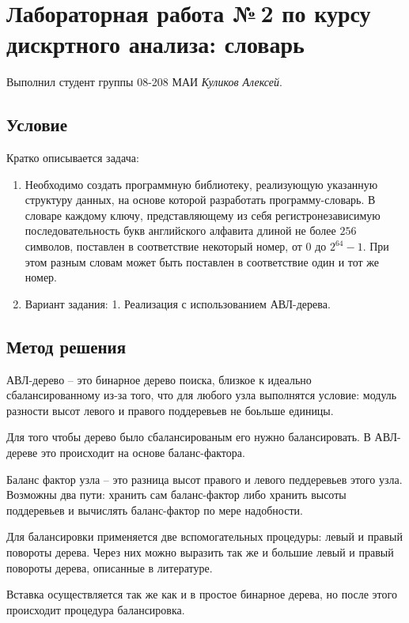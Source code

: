 \documentclass[12pt]{article}
\begin{document}
\section*{Лабораторная работа №\,2 по курсу дискртного анализа: словарь}

Выполнил студент группы 08-208 МАИ \textit{Куликов Алексей}.

\subsection*{Условие}

Кратко описывается задача: 
\begin{enumerate}
\item Необходимо создать программную библиотеку, реализующую указанную структуру данных, на основе которой разработать программу-словарь. В словаре каждому ключу, представляющему из себя регистронезависимую последовательность букв английского алфавита длиной не более $256$ символов, поставлен в соответствие некоторый номер, от $0$ до $2^{64} - 1$. При этом разным словам может быть поставлен в соответствие один и тот же номер.
\item Вариант задания: 1. Реализация с использованием АВЛ-дерева.
\end{enumerate}

\subsection*{Метод решения}

АВЛ-дерево -- это бинарное дерево поиска, близкое к идеально сбалансированному из-за того, что для любого узла выполнятся условие: модуль разности высот левого и правого поддеревьев не боьльше единицы. 

Для того чтобы дерево было сбалансированым его нужно балансировать. В АВЛ-дереве это происходит на основе баланс-фактора. 

Баланс фактор узла -- это разница высот правого и левого педдеревьев этого узла. Возможны два пути: хранить сам баланс-фактор либо хранить высоты поддеревьев и вычислять баланс-фактор по мере надобности.

Для балансировки применяется две вспомогательных процедуры: левый и правый повороты дерева. Через них можно выразить так же и большие левый и правый повороты дерева, описанные в литературе.

Вставка осуществляется так же как и в простое бинарное дерева, но после этого происходит процедура балансировка. 
\end{document}
